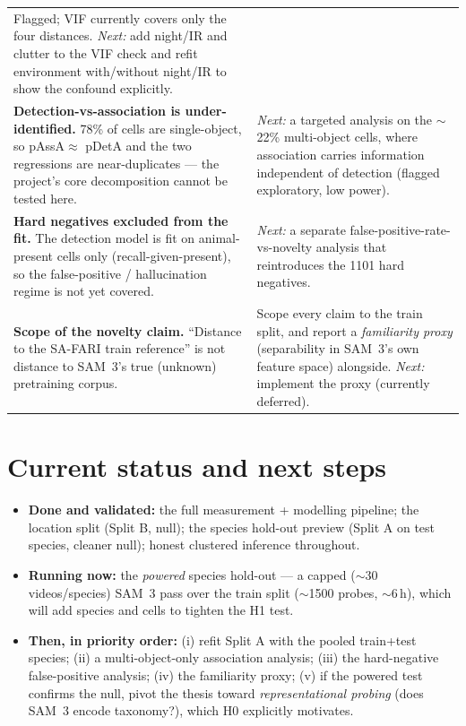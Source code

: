 \documentclass[11pt]{article}
\newcommand{\pdeta}{\textsf{pDetA}}
\newcommand{\passa}{\textsf{pAssA}}
\begin{document}
\begin{table}[h]
\begin{tabularx}{\textwidth}{p{4.3cm}Y}
Flagged; VIF currently covers only the four distances. \emph{Next:} add night/IR and clutter to the VIF
check and refit environment with/without night/IR to show the confound explicitly. \\
\addlinespace
\textbf{Detection-vs-association is under-identified.} 78\% of cells are single-object, so \passa{}$\approx$
\pdeta{} and the two regressions are near-duplicates --- the project's core decomposition cannot be tested
here. &
\emph{Next:} a targeted analysis on the $\sim$22\% multi-object cells, where association carries information
independent of detection (flagged exploratory, low power). \\
\addlinespace
\textbf{Hard negatives excluded from the fit.} The detection model is fit on animal-present cells only
(recall-given-present), so the false-positive / hallucination regime is not yet covered. &
\emph{Next:} a separate false-positive-rate-vs-novelty analysis that reintroduces the 1101 hard negatives. \\
\addlinespace
\textbf{Scope of the novelty claim.} ``Distance to the SA-FARI train reference'' is not distance to SAM~3's
true (unknown) pretraining corpus. &
Scope every claim to the train split, and report a \emph{familiarity proxy} (separability in SAM~3's own
feature space) alongside. \emph{Next:} implement the proxy (currently deferred). \\
\bottomrule
\end{tabularx}
\end{table}

\section{Current status and next steps}
\begin{itemize}[leftmargin=1.4em,itemsep=1pt]
  \item \textbf{Done and validated:} the full measurement + modelling pipeline; the location split (Split B,
        null); the species hold-out preview (Split A on test species, cleaner null); honest clustered
        inference throughout.
  \item \textbf{Running now:} the \emph{powered} species hold-out --- a capped ($\sim$30 videos/species)
        SAM~3 pass over the train split ($\sim$1500 probes, $\sim$6\,h), which will add species and cells to
        tighten the H1 test.
  \item \textbf{Then, in priority order:} (i) refit Split A with the pooled train+test species; (ii) a
        multi-object-only association analysis; (iii) the hard-negative false-positive analysis;
        (iv) the familiarity proxy; (v) if the powered test confirms the null, pivot the thesis toward
        \emph{representational probing} (does SAM~3 encode taxonomy?), which H0 explicitly motivates.
\end{itemize}
\end{document}
